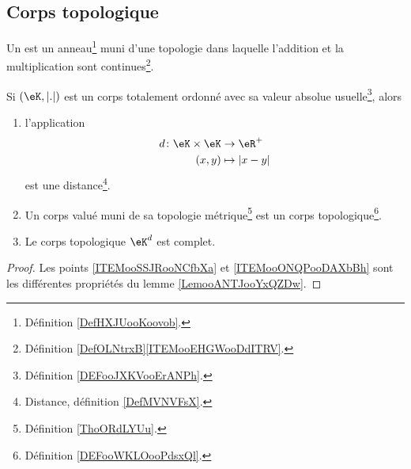 \subsection{Corps topologique}

\begin{definition}      \label{DEFooWKLOooPdsxQl}
	Un  est un anneau\footnote{Définition \ref{DefHXJUooKoovob}.} muni d'une topologie dans laquelle l'addition et la multiplication sont continues\footnote{Définition \ref{DefOLNtrxB}\ref{ITEMooEHGWooDdITRV}.}.
\end{definition}

\begin{propositionDef}      \label{PROPooAWAKooKRmbGT}
	Si \( (\eK, | . |)\) est un corps totalement ordonné avec sa valeur absolue usuelle\footnote{Définition \ref{DEFooJXKVooErANPh}.}, alors
	\begin{enumerate}
		\item		\label{ITEMooSSJRooNCfbXa}
		      l'application
		      \begin{equation}
			      \begin{aligned}
				      d\colon \eK\times \eK & \to \eR^+       \\
				      (x,y)                 & \mapsto | x-y |
			      \end{aligned}
		      \end{equation}
		      est une distance\footnote{Distance, définition \ref{DefMVNVFsX}.}.
		\item		\label{ITEMooONQPooDAXbBh}
		      Un corps valué muni de sa topologie métrique\footnote{Définition \ref{ThoORdLYUu}.} est un corps topologique\footnote{Définition \ref{DEFooWKLOooPdsxQl}.}.
		\item		\label{ITEMooFCDZooMilJfr}
		      Le corps topologique \( \eK^d\) est complet.
	\end{enumerate}
\end{propositionDef}

\begin{proof}
	Les points \ref{ITEMooSSJRooNCfbXa} et \ref{ITEMooONQPooDAXbBh} sont les différentes propriétés du lemme \ref{LemooANTJooYxQZDw}.
\end{proof}


